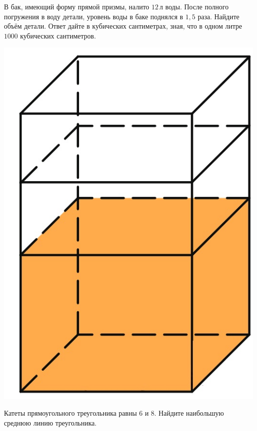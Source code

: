 \begin{homework}[number=3]
\begin{listofex}
\begin{minipage}[t]{0.27\linewidth}
		\end{minipage}
		\item
		\begin{minipage}[t]{0.68\linewidth}
			В бак, имеющий форму прямой призмы, налито \(12\) л воды. После полного погружения в воду детали, уровень воды в баке поднялся в \(1,5\) раза. Найдите объём детали. Ответ дайте в кубических сантиметрах, зная, что в одном литре \(1000\) кубических сантиметров.
		\end{minipage}
		\hspace{0.02\linewidth}
		\begin{minipage}[t]{0.27\linewidth}
			\includegraphics[align=t, width=\linewidth]{../pics/G101M8H3-11}
		\end{minipage}
		\item Катеты прямоугольного треугольника равны \(6\) и \(8\). Найдите наибольшую среднюю линию треугольника.

\end{listofex}
\end{homework}
